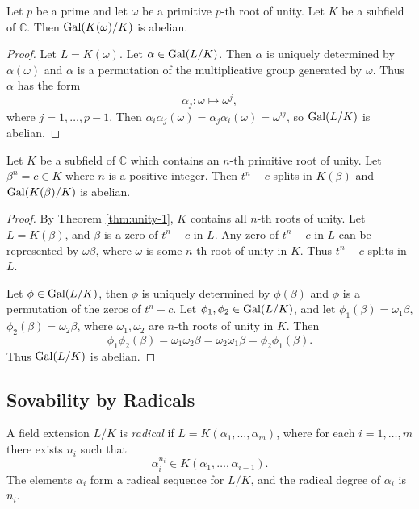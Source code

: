 \begin{theorem} \label{thm:radical-1}
	Let $p$ be a prime and let $\omega$ be a primitive $p$-th root of unity. Let $K$ be a subfield of $\mathbb C$. Then $\operatorname{Gal}(K(\omega) / K)$ is abelian.
\end{theorem}
\begin{proof}
	Let $L = K(\omega)$.  Let $\alpha \in \operatorname{Gal}(L / K)$. Then $\alpha$ is uniquely determined by $\alpha(\omega)$ and $\alpha$ is a permutation of the multiplicative group generated by $\omega$. Thus $\alpha$ has the form
	$$
	\alpha_j: \omega \mapsto \omega^j,
	$$
	where $j=1,\dots,p-1$. Then $\alpha_i \alpha_j (\omega) = \alpha_j \alpha_i (\omega) = \omega^{i j}$, so $ \operatorname{Gal}(L / K)$ is abelian.
	
\end{proof}

\begin{theorem} \label{thm:radical-2}
	Let $K$ be a subfield of $\mathbb{C}$ which contains an $n$-th primitive root of unity. Let $\beta^n = c \in K $ where $n$ is a positive integer. Then $t^n - c$ splits in $K(\beta)$ and $\operatorname{Gal}(K(\beta) / K)$ is abelian.
\end{theorem}

\begin{proof}
	By Theorem \ref{thm:unity-1}, $K$ contains all $n$-th roots of unity. Let $L = K(\beta)$, and $\beta$ is a zero of $t^n-c$ in $L$. Any zero of $t^n-c$ in $L$ can be represented by $\omega \beta$, where $\omega$ is some $n$-th root of unity in $K$. Thus $t^n - c$ splits in $L$.  
	
	Let $\phi \in \operatorname{Gal}(L / K)$, then $\phi$ is uniquely determined by $\phi(\beta)$ and $\phi$ is a permutation of the zeros of $t^n - c$. Let $\phi_1, \phi_2 \in \operatorname{Gal}(L / K)$, and let $\phi_1(\beta) = \omega_1\beta$, $\phi_2(\beta) = \omega_2\beta$, where $\omega_1, \omega_2$ are $n$-th roots of unity in $K$. Then
	$$
	\phi_1 \phi_2(\beta)=\omega_1 \omega_2 \beta=\omega_2 \omega_1  \beta=\phi_2 \phi_1(\beta).
	$$
	Thus $\operatorname{Gal}(L / K)$ is abelian.
\end{proof}

\subsection{Sovability by Radicals}

\begin{definition} \label{def:radical-extension}
	A field extension $L / K$ is \textit{radical} if $L=K\left(\alpha_1, \ldots, \alpha_m\right)$, where for each $i=1, \ldots, m$ there exists $n_i$ such that
	$$
	\alpha_i^{n_i} \in K\left(\alpha_1, \ldots, \alpha_{i-1}\right).
	$$
	The elements $\alpha_i$ form a radical sequence for $L / K$, and the radical degree of $\alpha_i$ is $n_i$.
\end{definition}



